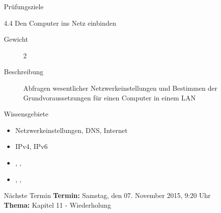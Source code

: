 \documentclass[aspectratio=43]{beamer}
\begin{document}
\begin{frame}{Prüfungsziele}
  \begin{alertblock}{4.4 Den Computer ins Netz einbinden}
    \begin{description}
      \item[Gewicht]  2
      \item[Beschreibung] Abfragen wesentlicher Netzwerkeinstellungen und Bestimmen der 
              Grundvoraussetzungen für einen Computer in einem LAN
    \end{description}
       Wissensgebiete\\ 
        \begin{itemize}
          \item Netzwerkeinstellungen, DNS, Internet
          \item IPv4, IPv6
          \item {}, , 
          \item {}, , 
        \end{itemize}
  \end{alertblock}
\end{frame}
\begin{frame}[plain]
  \begin{alertblock}{Nächste Termin}
    \textbf{Termin:} Samstag, den 07. November 2015, 9:20 Uhr\\
    \textbf{Thema:} Kapitel 11 - Wiederholung\\
  \end{alertblock}
\end{frame}



\materialframe
\versionframe
\end{document}
